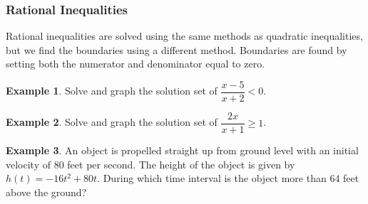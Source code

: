 \documentclass[addpoints,12pt]{exam}
\theoremstyle{definition}
\theoremstyle{break}
\theoremstyle{break}
\newtheorem{example}{Example}[subsection]
\begin{document}
\newpage

\subsubsection*{Rational Inequalities}
\vspace{.15in}
Rational inequalities are solved using the same methods as quadratic inequalities, but we find the boundaries using a different method. Boundaries are found by setting both the numerator and denominator equal to zero. 

\vspace{.15in}
\begin{example}
Solve and graph the solution set of $\dfrac{x-5}{x+2} < 0$.
\end{example}

\newpage

\begin{example}
Solve and graph the solution set of $\dfrac{2x}{x+1} \ge 1$.
\end{example}

\newpage

\begin{example}
An object is propelled straight up from ground level with an initial velocity of 80 feet per second. The height of the object is given by $h(t) = -16t^2 + 80t$. During which time interval is the object more than 64 feet above the ground?
\end{example}
\end{document}
